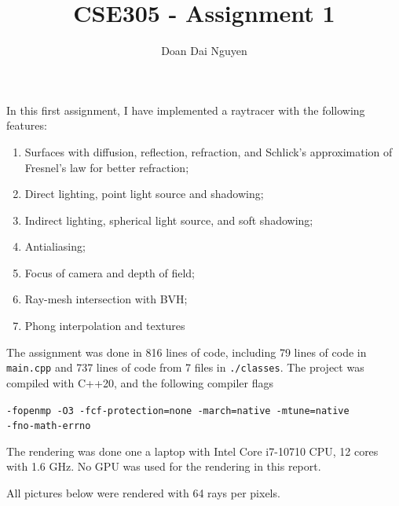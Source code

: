 \documentclass{amsart}
\title{CSE305 - Assignment 1}
\author{Doan Dai Nguyen}
\begin{document}
\maketitle

In this first assignment, I have implemented a raytracer with the following features:
\begin{enumerate}
    \item Surfaces with diffusion, reflection, refraction, and Schlick's approximation of Fresnel's law for better refraction;
    \item Direct lighting, point light source and shadowing;
    \item Indirect lighting, spherical light source, and soft shadowing;
    \item Antialiasing;
    \item Focus of camera and depth of field;
    \item Ray-mesh intersection with BVH;
    \item Phong interpolation and textures
\end{enumerate}

The assignment was done in 816 lines of code, including 79 lines of code in \texttt{main.cpp} and 737 lines of code from 7 files in \texttt{./classes}. The project was compiled with C++20, and the following compiler flags

\texttt{-fopenmp -O3 -fcf-protection=none -march=native -mtune=native \\-fno-math-errno}

The rendering was done one a laptop with Intel Core i7-10710 CPU, 12 cores with 1.6 GHz. No GPU was used for the rendering in this report.

All pictures below were rendered with 64 rays per pixels.
\end{document}
